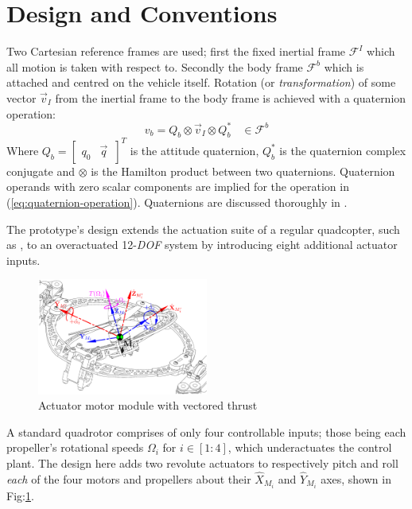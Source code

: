 \documentclass[a4paper, 10pt, conference]{ieeeconf}
\begin{document}
\section{Design and Conventions} 
\label{sec:design}
Two Cartesian reference frames are used; first the fixed inertial frame $\mathcal{F}^{I}$ which all motion is taken with respect to. Secondly the body frame $\mathcal{F}^{b}$ which is attached and centred on the vehicle itself. Rotation (or \emph{transformation}) of some vector $\vec{v}_I$ from the inertial frame to the body frame is achieved with a quaternion operation:
\begin{equation}\label{eq:quaternion-operation}
v_b=Q_b\otimes \vec{v}_I \otimes Q_b^*~~~~\in\mathcal{F}^{b}
\end{equation}
Where $Q_b=\begin{bmatrix}q_0 & \vec{q}\hspace{2pt}\end{bmatrix}^T$ is the attitude quaternion, $Q_b^*$ is the quaternion complex conjugate and $\otimes$ is the Hamilton product between two quaternions. Quaternion operands with zero scalar components are implied for the operation in (\ref{eq:quaternion-operation}). Quaternions are discussed thoroughly in \cite{shoemaker}. \par
The prototype's design extends the actuation suite of a regular quadcopter, such as \cite{x4flyer}, to an overactuated 12-\emph{DOF} system by introducing eight additional actuator inputs.
\newpage
\begin{figure}[tbp]
\centering
\includegraphics[width=0.5\textwidth]{figs/force-redirect}
\vspace{-14pt}
\caption{Actuator motor module with vectored thrust}
\label{fig:force-redirect}
\vspace{-18pt}
\end{figure}
A standard quadrotor comprises of only four controllable inputs; those being each propeller's rotational speeds $\Omega_{i}$ for $i\in[1:4]$, which underactuates the control plant. The design here adds two revolute actuators to respectively pitch and roll \emph{each} of the four motors and propellers about their $\hat{X}_{M_i}$ and $\hat{Y}_{M_i}$ axes, shown in Fig:\ref{fig:force-redirect}. 
\end{document}
